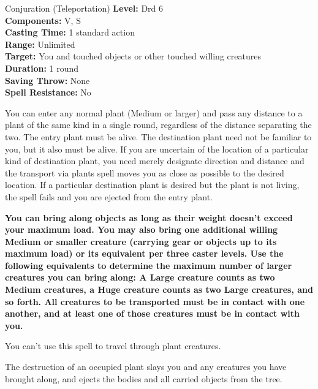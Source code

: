 {Conjuration (Teleportation)}
{
	\textbf{Level:}
	Drd 6\\
	\textbf{Components:}
	V, S\\
	\textbf{Casting Time:}
	1 standard action\\
	\textbf{Range:}
	Unlimited\\
	\textbf{Target:}
	You and touched objects or other touched willing creatures\\
	\textbf{Duration:}
	1 round\\
	\textbf{Saving Throw:}
	None\\
	\textbf{Spell Resistance:}
	No\\
}
{
	You can enter any normal plant (Medium or larger) and pass any distance to a plant of the same kind in a single round, regardless of the distance separating the two. The entry plant must be alive. The destination plant need not be familiar to you, but it also must be alive. If you are uncertain of the location of a particular kind of destination plant, you need merely designate direction and distance and the transport via plants spell moves you as close as possible to the desired location. If a particular destination plant is desired but the plant is not living, the spell fails and you are ejected from the entry plant.

	\textbf{	You can bring along objects as long as their weight doesn't exceed your maximum load. You may also bring one additional willing Medium or smaller creature (carrying gear or objects up to its maximum load) or its equivalent per three caster levels. Use the following equivalents to determine the maximum number of larger creatures you can bring along: A Large creature counts as two Medium creatures, a Huge creature counts as two Large creatures, and so forth. All creatures to be transported must be in contact with one another, and at least one of those creatures must be in contact with you.}

	You can't use this spell to travel through plant creatures.

	The destruction of an occupied plant slays you and any creatures you have brought along, and ejects the bodies and all carried objects from the tree.

}
